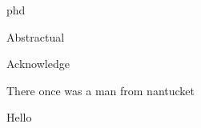 \documentclass[times,12pt,titlepage]{mstthesis} %
\begin{document}
\setlength{\parskip}{0pt}
\setlength{\parindent}{0.5in}

\begin{ThesisTitlePage}{phd}

\author{\MakeUppercase{Stephen Curtis Jackson}}









\end{ThesisTitlePage}


%

\begin{ThesisAbstract}
Abstractual
\end{ThesisAbstract}

\begin{ThesisAcknowledgment}
Acknowledge
\end{ThesisAcknowledgment}

\begin{ThesisFrontMatter}
\tableofcontents
\listoffigures
\listoftables
\end{ThesisFrontMatter}

\begin{ThesisBody}

There once was a man from nantucket

\end{ThesisBody}


%

%

\begin{Vita}
Hello
\end{Vita}

%
%
\end{document}
